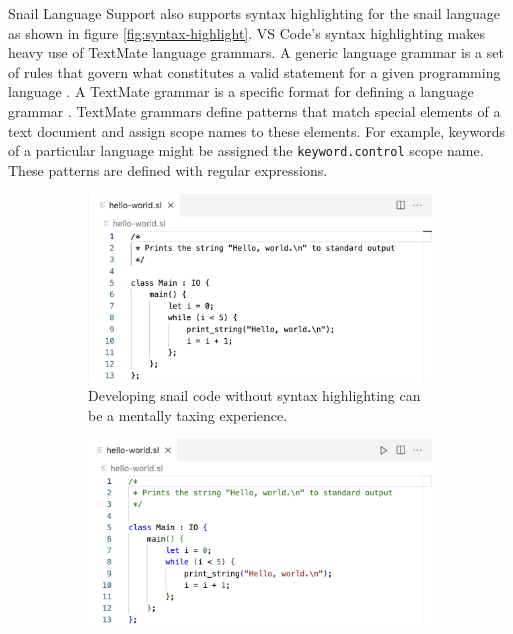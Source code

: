 \documentclass{article}
\begin{document}
Snail Language Support also supports syntax highlighting for the snail language as shown in figure \ref{fig:syntax-highlight}. VS Code's syntax highlighting makes heavy use of TextMate language grammars. A generic language grammar is a set of rules that govern what constitutes a valid statement for a given programming language \cite{pgrandinetti_2019}. A TextMate grammar is a specific format for defining a language grammar \cite{MacroMates_2021a}. TextMate grammars define patterns that match special elements of a text document and assign scope names to these elements. For example, keywords of a particular language might be assigned the \lstinline{keyword.control} scope name. These patterns are defined with regular expressions. 

\begin{figure}[b]
    \begin{subfigure}[c][][c]{0.45\textwidth}
        \begin{center}
            \includegraphics[width=\textwidth]{screenshots/dev-no-highlight-light.png}
            \caption{Developing snail code without syntax highlighting can be a mentally taxing experience.}
            \label{fig:dev-no-highlight}
        \end{center}
    \end{subfigure}
    \hspace{0.05\textwidth}
    \begin{subfigure}[c][][c]{0.45\textwidth}
        \begin{center}
            \includegraphics[width=\textwidth]{screenshots/dev-with-highlight-light.png}

\end{center}
\end{subfigure}
\end{figure}
\end{document}

